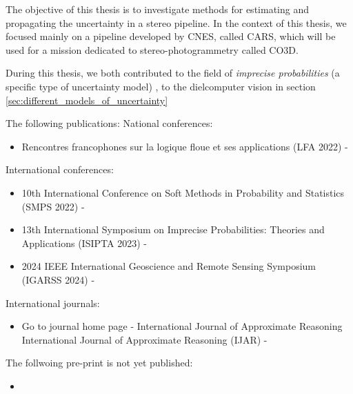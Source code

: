 The objective of this thesis is to investigate methods for estimating and propagating the uncertainty in a stereo pipeline. In the context of this thesis, we focused mainly on a pipeline developed by CNES, called CARS, which will be used for a mission dedicated to stereo-photogrammetry called CO3D. 

During this thesis, we both contributed to the field of \textit{imprecise probabilities} (a specific type of uncertainty model) \cite{}, to the dielcomputer vision 
in section \ref{sec:different_models_of_uncertainty}

The following publications:
National conferences:
\begin{itemize}
    \item Rencontres francophones sur la logique floue et ses applications (LFA 2022) - \cite{malinowski_copules_2022}
\end{itemize}
International conferences:
\begin{itemize}
    \item 10th International Conference on Soft Methods in Probability and Statistics (SMPS 2022) - \cite{malinowski_copulas_2022}
    \item 13th International Symposium on Imprecise Probabilities: Theories and Applications (ISIPTA 2023) - \cite{malinowski_uncertainty_2023}
    \item 2024 IEEE International Geoscience and Remote Sensing Symposium (IGARSS 2024) - \cite{malinowski_robust_2024}
\end{itemize}
International journals:
\begin{itemize}
    \item Go to journal home page - International Journal of Approximate Reasoning
International Journal of Approximate Reasoning (IJAR) - \cite{malinowski_uncertainty_2024}
\end{itemize}

The follwoing pre-print is not yet published:
\begin{itemize}
    \item \cite{malinowski_robust_2024-1}
\end{itemize}
\pagebreak